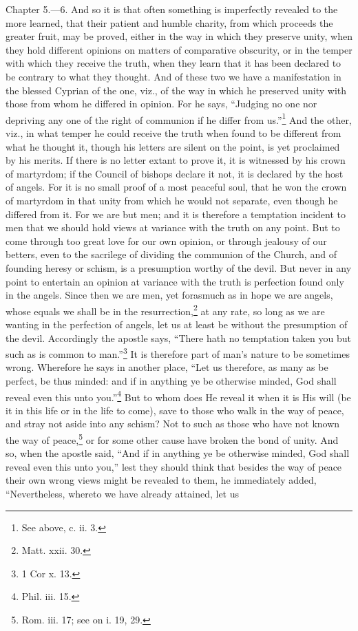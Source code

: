 
Chapter 5.—6. And so it is that often something is imperfectly revealed to the more learned, that their patient and humble charity, from which proceeds the greater fruit, may be proved, either in the way in which they preserve unity, when they hold different opinions on matters of comparative obscurity, or in the temper with which they receive the truth, when they learn that it has been declared to be contrary to what they thought. And of these two we have a manifestation in the blessed Cyprian of the one, viz., of the way in which he preserved unity with those from whom he differed in opinion. For he says, ``Judging no one nor depriving any one of the right of communion if he differ from us.''\footnote{\par  See above, c. ii. 3.} And the other, viz., in what temper he could receive the truth when found to be different from what he thought it, though his letters are silent on the point, is yet proclaimed by his merits. If there is no letter extant to prove it, it is witnessed by his crown of martyrdom; if the Council of bishops declare it not, it is declared by the host of angels. For it is no small proof of a most peaceful soul, that he won the crown of martyrdom in that unity from which he would not separate, even though he differed from it. For we are but men; and it is therefore a temptation incident to men that we should hold views at variance with the truth on any point. But to come through too great love for our own opinion, or through jealousy of our betters, even to the sacrilege of dividing the communion of the Church, and of founding heresy or schism, is a presumption worthy of the devil. But never in any point to entertain an opinion at variance with the truth is perfection found only in the angels. Since then we are men, yet forasmuch as in hope we are angels, whose equals we shall be in the resurrection,\footnote{\par  Matt. xxii. 30.} at any rate, so long as we are wanting in the perfection of angels, let us at least be without the presumption of the devil. Accordingly the apostle says, ``There hath no temptation taken you but such as is common to man.''\footnote{\par  1 Cor x. 13.} It is therefore part of man’s nature to be sometimes wrong. Wherefore he says in another place, ``Let us therefore, as many as be perfect, be thus minded: and if in anything ye be otherwise minded, God shall reveal even this unto you.''\footnote{\par  Phil. iii. 15.} But to whom does He reveal it when it is His will (be it in this life or in the life to come), save to those who walk in the way of peace, and stray not aside into any schism? Not to such as those who have not known the way of peace,\footnote{\par  Rom. iii. 17; see on i. 19, 29.} or for some other cause have broken the bond of unity. And so, when the apostle said, ``And if in anything ye be otherwise minded, God shall reveal even this unto you,'' lest they should think that besides the way of peace their own wrong views might be revealed to them, he immediately added, ``Nevertheless, whereto we have already attained, let us 